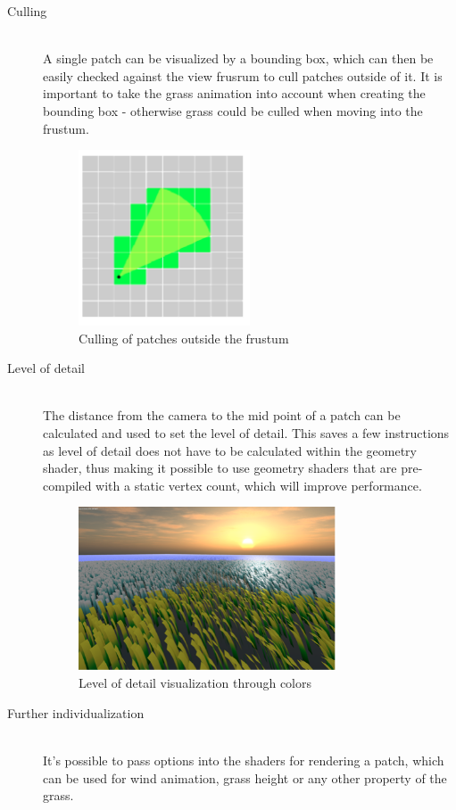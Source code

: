 \documentclass[conference]{acmsiggraph}
\begin{document}
\begin{description}
  \item[Culling] \hfill \\
  A single patch can be visualized by a bounding box, which can then be easily checked against the view frusrum to cull patches outside of it. It is important to take the grass animation into account when creating the bounding box - otherwise grass could be culled when moving into the frustum.
   \begin{figure}[ht]
   \centering
   \includegraphics[width=2.0in]{images/culling}
   \caption{Culling of patches outside the frustum}
 \end{figure}    
  
  \item[Level of detail] \hfill \\
  The distance from the camera to the mid point of a patch can be calculated and used to set the level of detail. This saves a few instructions as level of detail does not have to be calculated within the geometry shader, thus making it possible to use geometry shaders that are pre-compiled with a static vertex count, which will improve performance.

 \begin{figure}[ht]
   \centering
   \includegraphics[width=3.0in]{images/levelOfDetail}
   \caption{Level of detail visualization through colors}
 \end{figure}  
  
  \item[Further individualization] \hfill \\
	It's possible to pass options into the shaders for rendering a patch, which can be used for wind animation, grass height or any other property of the grass.
\end{description}
\end{document}

